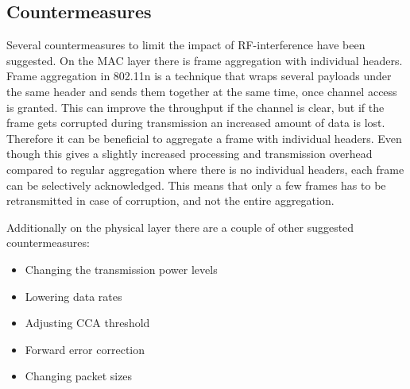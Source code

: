 	\subsection{Countermeasures}
	Several countermeasures to limit the impact of RF-interference have been suggested.
	On the MAC layer there is frame aggregation with individual headers.
	Frame aggregation in 802.11n is a technique that wraps several payloads under the same
	header and sends them together at the same time, once channel access is granted. This can improve the throughput
	if the channel is clear, but if the frame gets corrupted during transmission
	an increased amount of data is lost.
	Therefore it can be beneficial to aggregate a frame with individual headers.
	Even though this gives a slightly increased processing and transmission overhead
	compared to regular aggregation where there is no individual headers, 
	each frame can be selectively acknowledged.
	This means that only a few frames has to be retransmitted in case of corruption,
	and not the entire aggregation. 

	Additionally on the physical layer there are a couple of other suggested countermeasures:
	\begin{itemize}
	\item Changing the transmission power levels
	\item Lowering data rates
	\item Adjusting CCA threshold
	\item Forward error correction
	\item Changing packet sizes
	\end{itemize}


